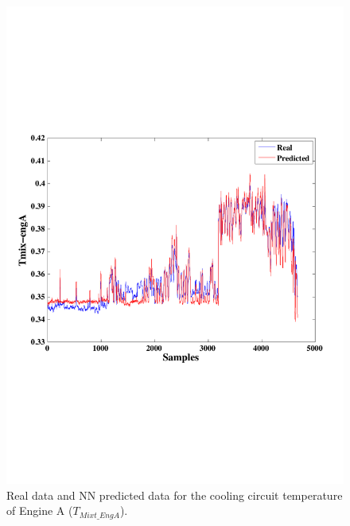 \begin{figure}
\centering
\includegraphics[width=1\textwidth]{figures/IrrigationA-ANN.pdf}
\caption{Real data and NN predicted data for the cooling circuit temperature of Engine A ($T_{Mixt\_EngA}$).}
\label{TcoolA}
\end{figure}

